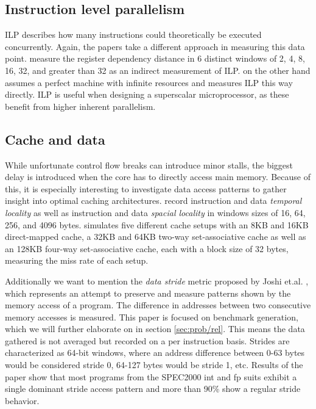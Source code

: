\documentclass[../bachelor_paper.tex]{subfiles}
\begin{document}
\subsection{Instruction level parallelism}
\Acf{ILP} describes how many instructions could theoretically be executed concurrently. Again, the papers take a different approach in measuring this data point. \cite{phansalkarMeasuringProgramSimilarity2005,joshiMeasuringBenchmarkSimilarity2006} measure the register dependency distance in 6 distinct windows of 2, 4, 8, 16, 32, and greater than 32 as an indirect measurement of \ac{ILP}. \cite{eeckhoutQuantifyingImpactInput} on the other hand assumes a perfect machine with infinite resources and measures \ac{ILP} this way directly. \Ac{ILP} is useful when designing a superscalar microprocessor, as these benefit from higher inherent parallelism.

\subsection{Cache and data}
While unfortunate control flow breaks can introduce minor stalls, the biggest delay is introduced when the core has to directly access main memory. Because of this, it is especially interesting to investigate data access patterns to gather insight into optimal caching architectures. \cite{phansalkarMeasuringProgramSimilarity2005,joshiMeasuringBenchmarkSimilarity2006} record instruction and data \emph{temporal locality} as well as instruction and data \emph{spacial locality} in windows sizes of 16, 64, 256, and 4096 bytes. \cite{eeckhoutQuantifyingImpactInput} simulates five different cache setups with an 8KB and 16KB direct-mapped cache, a 32KB and 64KB two-way set-associative cache as well as an 128KB four-way set-associative cache, each with a block size of 32 bytes, measuring the miss rate of each setup.

Additionally we want to mention the \emph{data stride} metric proposed by Joshi et.al. \cite{joshiDistillingEssenceProprietary2008}, which represents an attempt to preserve and measure patterns shown by the memory access of a program. The difference in addresses between two consecutive memory accesses is measured. This paper is focused on benchmark generation, which we will further elaborate on in section \ref{sec:prob/rel}. This means the data gathered is not averaged but recorded on a per instruction basis. Strides are characterized as 64-bit windows, where an address difference between 0-63 bytes would be considered stride 0, 64-127 bytes would be stride 1, etc. Results of the paper show that most programs from the \acs{SPEC}2000 int and fp suits exhibit a single dominant stride access pattern and more than 90\% show a regular stride behavior.
\end{document}
